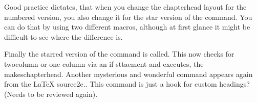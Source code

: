 
\begin{teXXX}
\def\@chapter[#1]#2{\ifnum \c@secnumdepth >\m@ne
                       \if@mainmatter
                         \refstepcounter{chapter}%
                         \typeout{\@chapapp\space\thechapter.}%
                         \addcontentsline{toc}{chapter}%
                                   {\protect\numberline{\thechapter}#1}%
                       \else
                         \addcontentsline{toc}{chapter}{#1}%
                       \fi
                    \else
                      \addcontentsline{toc}{chapter}{#1}%
                    \fi
                    \chaptermark{#1}%
                    \addtocontents{lof}{\protect\addvspace{10\p@}}%
                    \addtocontents{lot}{\protect\addvspace{10\p@}}%
                    \if@twocolumn
                      \@topnewpage[\@makechapterhead{#2}]%
                    \else
                      \@makechapterhead{#2}%
                      \@afterheading
                    \fi}
\end{teXXX}

\begin{multicols}{2}

Good practice dictates, that when you change the chapterhead layout for the numbered version, you also change it for the star version of the command. You can do that by using two different macros, although at first glance it might be difficult to see where the difference is.
\end{multicols}


\begin{teXXX}
\def\@makechapterhead
\def\@makeschapterhead
\end{teXXX}

\begin{teXXX}
\def\@makechapterhead#1{%
  \vspace*{50\p@}%
  {\parindent \z@ \raggedright \normalfont
    \ifnum \c@secnumdepth >\m@ne
      \if@mainmatter
        \huge\bfseries \@chapapp\space \thechapter
        \par\nobreak
        \vskip 20\p@
      \fi
    \fi
    \interlinepenalty\@M
    \Huge \bfseries #1\par\nobreak
    \vskip 40\p@
  }}
\end{teXXX}

\begin{multicols}{2}
Finally the starred version of the command is called. This now checks for twocolumn or one column via an if sttaement and executes, the makeschapterhead. Another mysterious and wonderful command appears again from the LaTeX source2e.\cmd{\@afterheading}. This command 
is just a hook for custom headings? (Needs to be reviewed again).
\end{multicols}

